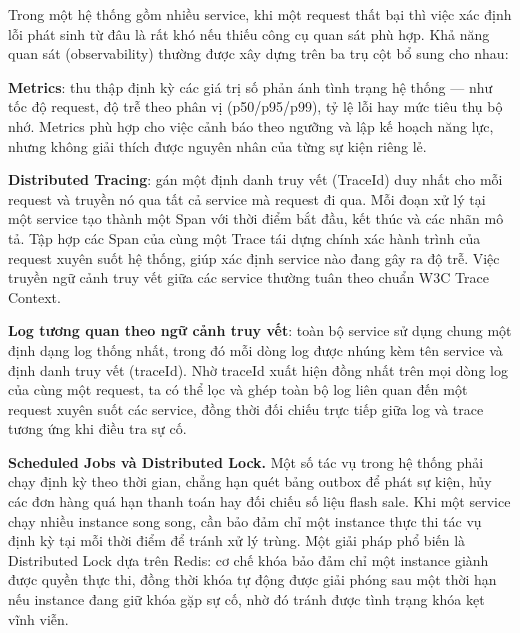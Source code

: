 \documentclass[../DoAn.tex]{subfiles}
\begin{document}
Trong một hệ thống gồm nhiều service, khi một request thất bại thì việc xác định lỗi phát
sinh từ đâu là rất khó nếu thiếu công cụ quan sát phù hợp. Khả năng quan sát (observability)
thường được xây dựng trên ba trụ cột bổ sung cho nhau:

\textbf{Metrics}: thu thập định kỳ các giá trị số phản ánh tình trạng hệ thống --- như tốc
độ request, độ trễ theo phân vị (p50/p95/p99), tỷ lệ lỗi hay mức tiêu thụ bộ nhớ. Metrics
phù hợp cho việc cảnh báo theo ngưỡng và lập kế hoạch năng lực, nhưng không giải thích được
nguyên nhân của từng sự kiện riêng lẻ.

\textbf{Distributed Tracing}: gán một định danh truy vết (TraceId) duy nhất cho mỗi request
và truyền nó qua tất cả service mà request đi qua. Mỗi đoạn xử lý tại một service tạo thành
một Span với thời điểm bắt đầu, kết thúc và các nhãn mô tả. Tập hợp các Span của cùng một
Trace tái dựng chính xác hành trình của request xuyên suốt hệ thống, giúp xác định service
nào đang gây ra độ trễ. Việc truyền ngữ cảnh truy vết giữa các service thường tuân theo chuẩn
W3C Trace Context.

\textbf{Log tương quan theo ngữ cảnh truy vết}: toàn bộ service sử dụng chung một định dạng
log thống nhất, trong đó mỗi dòng log được nhúng kèm tên service và định danh truy vết
(traceId). Nhờ traceId xuất hiện đồng nhất trên mọi dòng log của cùng một request, ta có thể
lọc và ghép toàn bộ log liên quan đến một request xuyên suốt các service, đồng thời đối chiếu
trực tiếp giữa log và trace tương ứng khi điều tra sự cố.

\textbf{Scheduled Jobs và Distributed Lock.} Một số tác vụ trong hệ thống phải chạy định kỳ
theo thời gian, chẳng hạn quét bảng outbox để phát sự kiện, hủy các đơn hàng quá hạn thanh
toán hay đối chiếu số liệu flash sale. Khi một service chạy nhiều instance song song, cần
bảo đảm chỉ một instance thực thi tác vụ định kỳ tại mỗi thời điểm để tránh xử lý trùng. Một
giải pháp phổ biến là Distributed Lock dựa trên Redis: cơ chế khóa bảo đảm chỉ một instance
giành được quyền thực thi, đồng thời khóa tự động được giải phóng sau một thời hạn nếu
instance đang giữ khóa gặp sự cố, nhờ đó tránh được tình trạng khóa kẹt vĩnh viễn.
\end{document}
